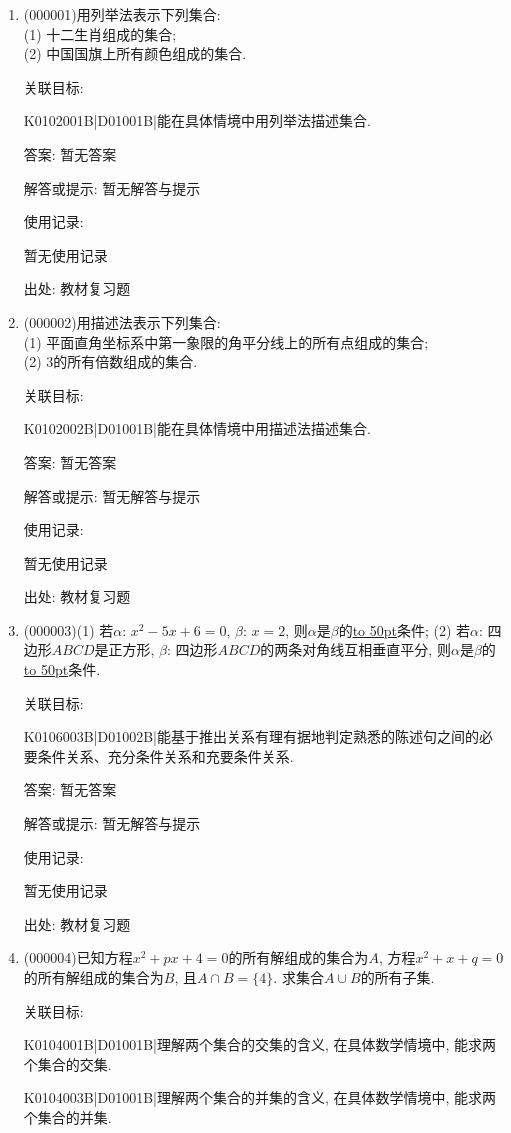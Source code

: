 \documentclass[10pt,a4paper]{article}
\newcommand{\blank}[1]{\underline{\hbox to #1pt{}}}
\begin{document}
\begin{enumerate}[1.]

\item { (000001)}用列举法表示下列集合:\\
(1) 十二生肖组成的集合;\\
(2) 中国国旗上所有颜色组成的集合.


关联目标:

K0102001B|D01001B|能在具体情境中用列举法描述集合.

答案: 暂无答案

解答或提示: 暂无解答与提示

使用记录:

暂无使用记录


出处: 教材复习题
\item { (000002)}用描述法表示下列集合:\\
(1) 平面直角坐标系中第一象限的角平分线上的所有点组成的集合;\\
(2) $3$的所有倍数组成的集合.


关联目标:

K0102002B|D01001B|能在具体情境中用描述法描述集合.

答案: 暂无答案

解答或提示: 暂无解答与提示

使用记录:

暂无使用记录


出处: 教材复习题
\item { (000003)}(1) 若$\alpha$: $x^2-5x+6=0$, $\beta$: $x=2$, 则$\alpha$是$\beta$的\blank{50}条件;
(2) 若$\alpha$: 四边形$ABCD$是正方形, $\beta$: 四边形$ABCD$的两条对角线互相垂直平分, 则$\alpha$是$\beta$的\blank{50}条件.


关联目标:

K0106003B|D01002B|能基于推出关系有理有据地判定熟悉的陈述句之间的必要条件关系、充分条件关系和充要条件关系.

答案: 暂无答案

解答或提示: 暂无解答与提示

使用记录:

暂无使用记录


出处: 教材复习题
\item { (000004)}已知方程$x^2+px+4=0$的所有解组成的集合为$A$, 方程$x^2+x+q=0$的所有解组成的集合为$B$, 且$A\cap B=\{4\}$. 求集合$A\cup B$的所有子集.


关联目标:

K0104001B|D01001B|理解两个集合的交集的含义, 在具体数学情境中, 能求两个集合的交集.

K0104003B|D01001B|理解两个集合的并集的含义, 在具体数学情境中, 能求两个集合的并集.


\end{enumerate}
\end{document}
